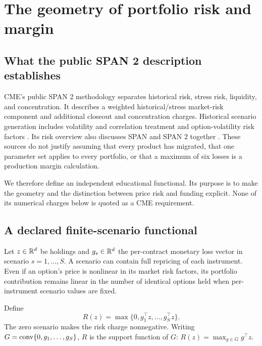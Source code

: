 \section{The geometry of portfolio risk and margin}
\label{sec:margin}

\subsection{What the public SPAN 2 description establishes}

CME's public SPAN 2 methodology separates historical risk, stress risk, liquidity, and concentration. It describes a weighted historical/stress market-risk component and additional closeout and concentration charges. Historical scenario generation includes volatility and correlation treatment and option-volatility risk factors \citep{CMESPAN2}. Its risk overview also discusses SPAN and SPAN 2 together \citep{CMERisk}. These sources do not justify assuming that every product has migrated, that one parameter set applies to every portfolio, or that a maximum of six losses is a production margin calculation.

We therefore define an independent educational functional. Its purpose is to make the geometry and the distinction between price risk and funding explicit. None of its numerical charges below is quoted as a CME requirement.

\subsection{A declared finite-scenario functional}

Let $z\in\mathbb R^d$ be holdings and $g_s\in\mathbb R^d$ the per-contract monetary loss vector in scenario $s=1,\ldots,S$. A scenario can contain full repricing of each instrument. Even if an option's price is nonlinear in its market risk factors, its portfolio contribution remains linear in the number of identical options held when per-instrument scenario values are fixed.

Define
\begin{equation}
 R(z)=\max\{0,g_1^\top z,\ldots,g_S^\top z\}.
\label{eq:scenario}
\end{equation}
The zero scenario makes the risk charge nonnegative. Writing $G=\operatorname{conv}\{0,g_1,\ldots,g_S\}$, $R$ is the support function of $G$: $R(z)=\max_{g\in G}g^\top z$.

